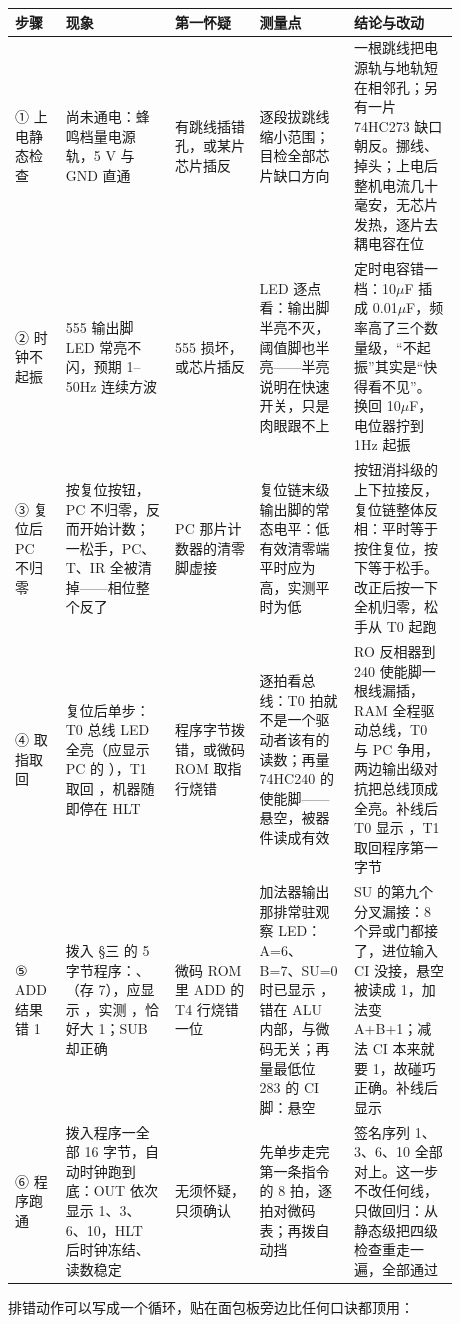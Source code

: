 \begin{longtable}{L{0.09\linewidth}L{0.22\linewidth}L{0.17\linewidth}L{0.19\linewidth}L{0.21\linewidth}}
\toprule
步骤 & 现象 & 第一怀疑 & 测量点 & 结论与改动 \\
\midrule
① 上电静态检查 & 尚未通电：蜂鸣档量电源轨，5 V 与 GND 直通 & 有跳线插错孔，或某片芯片插反 & 逐段拔跳线缩小范围；目检全部芯片缺口方向 & 一根跳线把电源轨与地轨短在相邻孔；另有一片 74HC273 缺口朝反。挪线、掉头；上电后整机电流几十毫安，无芯片发热，逐片去耦电容在位 \\
② 时钟不起振 & 555 输出脚 LED 常亮不闪，预期 1--50Hz 连续方波 & 555 损坏，或芯片插反 & LED 逐点看：输出脚半亮不灭，阈值脚也半亮——半亮说明在快速开关，只是肉眼跟不上 & 定时电容错一档：10$\mu$F 插成 0.01$\mu$F，频率高了三个数量级，“不起振”其实是“快得看不见”。换回 10$\mu$F，电位器拧到 1Hz 起振 \\
③ 复位后 PC 不归零 & 按复位按钮，PC 不归零，反而开始计数；一松手，PC、T、IR 全被清掉——相位整个反了 & PC 那片计数器的清零脚虚接 & 复位链末级输出脚的常态电平：低有效清零端平时应为高，实测平时为低 & 按钮消抖级的上下拉接反，复位链整体反相：平时等于按住复位，按下等于松手。改正后按一下全机归零，松手从 T0 起跑 \\
④ 取指取回  & 复位后单步：T0 总线 LED 全亮（应显示 PC 的 ），T1 取回 ，机器随即停在 HLT & 程序字节拨错，或微码 ROM 取指行烧错 & 逐拍看总线：T0 拍就不是一个驱动者该有的读数；再量 74HC240 的使能脚——悬空，被器件读成有效 & RO 反相器到 240 使能脚一根线漏插，RAM 全程驱动总线，T0 与 PC 争用，两边输出级对抗把总线顶成全亮。补线后 T0 显示 ，T1 取回程序第一字节 \\
⑤ ADD 结果错 1 & 拨入 §三 的 5 字节程序：、（存 7），应显示 ，实测 ，恰好大 1；SUB 却正确 & 微码 ROM 里 ADD 的 T4 行烧错一位 & 加法器输出那排常驻观察 LED：A=6、B=7、SU=0 时已显示 ，错在 ALU 内部，与微码无关；再量最低位 283 的 CI 脚：悬空 & SU 的第九个分叉漏接：8 个异或门都接了，进位输入 CI 没接，悬空被读成 1，加法变 A+B+1；减法 CI 本来就要 1，故碰巧正确。补线后显示  \\
⑥ 程序跑通 & 拨入程序一全部 16 字节，自动时钟跑到底：OUT 依次显示 1、3、6、10，HLT 后时钟冻结、读数稳定 & 无须怀疑，只须确认 & 先单步走完第一条指令的 8 拍，逐拍对微码表；再拨自动挡 & 签名序列 1、3、6、10 全部对上。这一步不改任何线，只做回归：从静态级把四级检查重走一遍，全部通过 \\
\bottomrule
\end{longtable}

排错动作可以写成一个循环，贴在面包板旁边比任何口诀都顶用：

